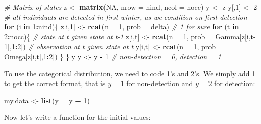 \documentclass[
  12pt,
]{krantz}
\newenvironment{Shaded}{\begin{snugshade}}{\end{snugshade}}
\newcommand{\AttributeTok}[1]{\textcolor[rgb]{0.13,0.29,0.53}{#1}}
\newcommand{\CommentTok}[1]{\textcolor[rgb]{0.56,0.35,0.01}{\textit{#1}}}
\newcommand{\ConstantTok}[1]{\textcolor[rgb]{0.56,0.35,0.01}{#1}}
\newcommand{\ControlFlowTok}[1]{\textcolor[rgb]{0.13,0.29,0.53}{\textbf{#1}}}
\newcommand{\DecValTok}[1]{\textcolor[rgb]{0.00,0.00,0.81}{#1}}
\newcommand{\FunctionTok}[1]{\textcolor[rgb]{0.13,0.29,0.53}{\textbf{#1}}}
\newcommand{\NormalTok}[1]{#1}
\newcommand{\OtherTok}[1]{\textcolor[rgb]{0.56,0.35,0.01}{#1}}
\newcommand{\SpecialCharTok}[1]{\textcolor[rgb]{0.81,0.36,0.00}{\textbf{#1}}}
\begin{document}
\begin{Shaded}
\begin{Highlighting}[]
\CommentTok{\# Matrix of states}
\NormalTok{z }\OtherTok{\textless{}{-}} \FunctionTok{matrix}\NormalTok{(}\ConstantTok{NA}\NormalTok{, }\AttributeTok{nrow =}\NormalTok{ nind, }\AttributeTok{ncol =}\NormalTok{ nocc)}
\NormalTok{y }\OtherTok{\textless{}{-}}\NormalTok{ z}
\NormalTok{y[,}\DecValTok{1}\NormalTok{] }\OtherTok{\textless{}{-}} \DecValTok{2} \CommentTok{\# all individuals are detected in first winter, as we condition on first detection}
\ControlFlowTok{for}\NormalTok{ (i }\ControlFlowTok{in} \DecValTok{1}\SpecialCharTok{:}\NormalTok{nind)\{}
\NormalTok{  z[i,}\DecValTok{1}\NormalTok{] }\OtherTok{\textless{}{-}} \FunctionTok{rcat}\NormalTok{(}\AttributeTok{n =} \DecValTok{1}\NormalTok{, }\AttributeTok{prob =}\NormalTok{ delta) }\CommentTok{\# 1 for sure}
  \ControlFlowTok{for}\NormalTok{ (t }\ControlFlowTok{in} \DecValTok{2}\SpecialCharTok{:}\NormalTok{nocc)\{}
    \CommentTok{\# state at t given state at t{-}1}
\NormalTok{    z[i,t] }\OtherTok{\textless{}{-}} \FunctionTok{rcat}\NormalTok{(}\AttributeTok{n =} \DecValTok{1}\NormalTok{, }\AttributeTok{prob =}\NormalTok{ Gamma[z[i,t}\DecValTok{{-}1}\NormalTok{],}\DecValTok{1}\SpecialCharTok{:}\DecValTok{2}\NormalTok{]) }
    \CommentTok{\# observation at t given state at t}
\NormalTok{    y[i,t] }\OtherTok{\textless{}{-}} \FunctionTok{rcat}\NormalTok{(}\AttributeTok{n =} \DecValTok{1}\NormalTok{, }\AttributeTok{prob =}\NormalTok{ Omega[z[i,t],}\DecValTok{1}\SpecialCharTok{:}\DecValTok{2}\NormalTok{]) }
\NormalTok{  \}}
\NormalTok{\}}
\NormalTok{y}
\NormalTok{y }\OtherTok{\textless{}{-}}\NormalTok{ y }\SpecialCharTok{{-}} \DecValTok{1} \CommentTok{\# non{-}detection = 0, detection = 1}
\end{Highlighting}
\end{Shaded}

To use the categorical distribution, we need to code 1's and 2's. We simply add 1 to get the correct format, that is \(y = 1\) for non-detection and \(y = 2\) for detection:

\begin{Shaded}
\begin{Highlighting}[]
\NormalTok{my.data }\OtherTok{\textless{}{-}} \FunctionTok{list}\NormalTok{(}\AttributeTok{y =}\NormalTok{ y }\SpecialCharTok{+} \DecValTok{1}\NormalTok{)}
\end{Highlighting}
\end{Shaded}

Now let's write a function for the initial values:
\end{document}
